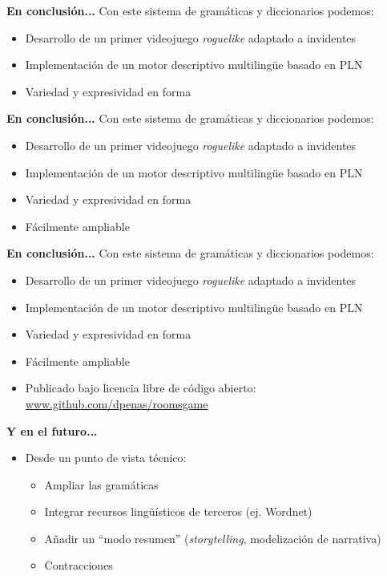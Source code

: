 \begin{tframe}{\textbf{En conclusión...}}
	Con este sistema de gramáticas y diccionarios podemos:
	\begin{itemize}
		\item Desarrollo de un primer videojuego \textit{roguelike} adaptado a invidentes
		\item Implementación de un motor descriptivo multilingüe basado en PLN
		\item<+-| alert@+> Variedad y expresividad en forma
	\end{itemize}
\end{tframe}

\begin{tframe}{\textbf{En conclusión...}}
	Con este sistema de gramáticas y diccionarios podemos:
	\begin{itemize}
		\item Desarrollo de un primer videojuego \textit{roguelike} adaptado a invidentes
		\item Implementación de un motor descriptivo multilingüe basado en PLN
		\item Variedad y expresividad en forma
		\item<+-| alert@+> Fácilmente ampliable
	\end{itemize}
\end{tframe}

\begin{tframe}{\textbf{En conclusión...}}
	Con este sistema de gramáticas y diccionarios podemos:
	\begin{itemize}
		\item Desarrollo de un primer videojuego \textit{roguelike} adaptado a invidentes
		\item Implementación de un motor descriptivo multilingüe basado en PLN
		\item Variedad y expresividad en forma
		\item Fácilmente ampliable
		\item<+-| alert@+> Publicado bajo licencia libre de código abierto: \url{www.github.com/dpenas/roomsgame}
	\end{itemize}
\end{tframe}

\begin{tframe}{\textbf{Y en el futuro...}}
	\begin{itemize}
		\item<+-| alert@+> Desde un punto de vista técnico:
			\begin{itemize}
				\item Ampliar las gramáticas
				\item Integrar recursos lingüísticos de terceros (ej. Wordnet)
				\item Añadir un ``modo resumen'' (\textit{storytelling}, modelización de narrativa)
				\item Contracciones
			\end{itemize}
	\end{itemize}
\end{tframe}

